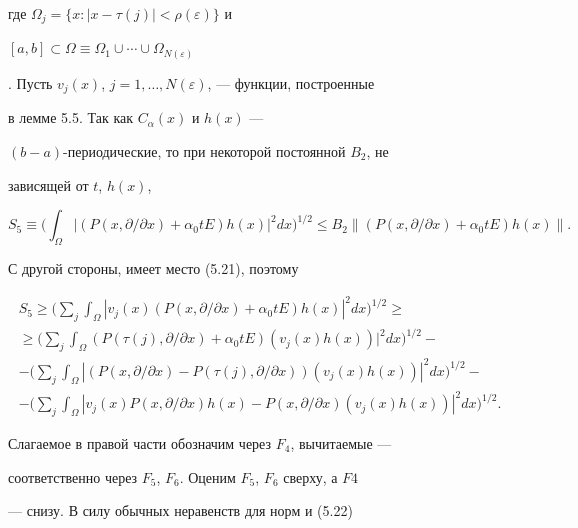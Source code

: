 где $\Omega_j=\{x:|x-\tau(j)|<\rho(\varepsilon)\}$ и 


$[a,b]\subset\Omega\equiv\Omega_1\cup\dotsb\cup\Omega_{N(\varepsilon)}$


. Пусть $v_j(x)$, $j=1,\dotsc,N(\varepsilon)$, --- функции, построенные 


в лемме 5.5. Так как $C_\alpha(x)$ и $h(x)$ --- 


$(b{-}a)$-периодические, то при некоторой постоянной $B_2$, не 


зависящей от $t$, $h(x)$, 


$$ 


S_5\equiv\bigg(\int_\Omega|(P(x,\partial/\partial x)+ 


\alpha_0t E)h(x)|^2dx\bigg)^{1/2}\le B_2 


\|(P(x,\partial/\partial x)+\alpha_0 t E)h(x)\|. 


$$ 


С другой стороны, имеет место (5.21), поэтому 


\begin{multline*} 


S_5\ge\bigg(\sum_j\int_\Omega|v_j(x)(P(x,\partial/\partial x)+ 


\alpha_0t E)h(x)|^2dx\bigg)^{1/2} \ge \\ 


% 


\ge\bigg(\sum_j\int_\Omega(P(\tau(j),\partial/\partial x)+ 


\alpha_0t E)(v_j(x)h(x))|^2dx\bigg)^{1/2}- \\ 


% 


-\bigg(\sum_j\int_\Omega|(P(x,\partial/\partial x)- 


P(\tau(j),\partial/\partial x))(v_j(x)h(x))|^2dx\bigg)^{1/2}- \\ 


% 


-\bigg(\sum_j\int_\Omega|v_j(x)P(x,\partial/\partial x) 


h(x)-P(x,\partial/\partial x)(v_j(x)h(x))|^2dx\bigg)^{1/2}. 


\end{multline*} 


Слагаемое в правой части обозначим через $F_4$, вычитаемые --- 


соответственно через $F_5$, $F_6$. Оценим $F_5$, $F_6$ сверху, а $F4$ 


--- снизу. В силу обычных неравенств для норм и (5.22) 


